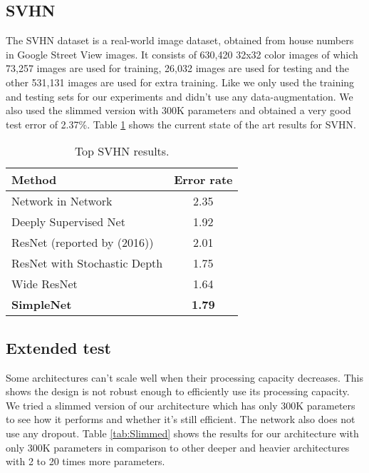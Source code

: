 \documentclass{article} \usepackage{lets_keepit_simple,times}
\begin{document}
\subsection{SVHN}
The SVHN dataset \cite{Netzer_ReadingDigits_2011} is a real-world image dataset, obtained from house numbers in Google Street View images. It consists of 630,420 32x32 color images of which 73,257 images are used for training, 26,032 images are used for testing and the other 531,131 images are used for extra training. Like \cite{Huang_DeepNN_StochDepth_2016, Goodfellow_MaxoutNetwork_2013, Lin_NIN_2013} we only used the training and testing sets for our experiments and didn't use any data-augmentation. We also used the slimmed version with 300K parameters and obtained a very good test error of 2.37\%. Table \ref{tab:SVHN} shows the current state of the art results for SVHN.



\begin{table}[h!]
\caption{Top SVHN results.}\label{tab:SVHN}
\begin{center}
\begin{tabular}{lc}
\textbf{Method} & \textbf{Error rate} \\ \hline
Network in Network\cite{Lin_NIN_2013}    &	2.35 \\
Deeply Supervised Net\cite{Lee_DeeplySupervisedNet_2015}	& 1.92 \\
ResNet\cite{He_ResNet_2015} (reported by \cite{Huang_DeepNN_StochDepth_2016} (2016)) &	2.01 \\
ResNet with Stochastic Depth\cite{Huang_DeepNN_StochDepth_2016}	&1.75\\
Wide ResNet\cite{Zagoruyko_WRN_2016}  &	1.64\\
\textbf{SimpleNet}	& \textbf{1.79}\\\hline
\end{tabular}
\end{center}
\end{table}

\subsection{Extended test}
Some architectures can't scale well when their processing capacity decreases. This shows the design is not robust enough to efficiently use its processing capacity. We tried a slimmed version of our architecture which has only 300K parameters to see how it performs and whether it's still efficient. The network also does not use any dropout. Table \ref{tab:Slimmed} shows the results for our architecture with only 300K parameters in comparison to other deeper and heavier architectures with 2 to 20 times more parameters. 
\end{document}
